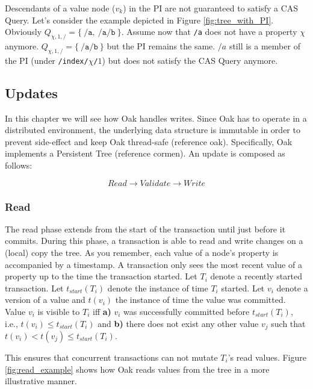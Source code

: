 \documentclass[abstracton,12pt]{scrreprt}
\begin{document}
Descendants of a value node ($v_k$) in the PI are not guaranteed to satisfy a CAS Query. 
Let's consider the example depicted in Figure \ref{fig:tree_with_PI}.
Obviously $Q_{\chi, 1, \texttt{/}} = \{\ \texttt{/a},\ \texttt{/a/b}\ \}$.
Assume now that \texttt{/a} does not have a property $\chi$ anymore.
$Q_{\chi, 1, \texttt{/}} = \{\ \texttt{/a/b}\ \}$ but the PI remains the same.
$/a$ still is a member of the PI (under \texttt{/index/$\chi$/$1$}) but does not satisfy the CAS Query anymore.

\subsection{Updates}

In this chapter we will see how Oak handles writes.
Since Oak has to operate in a distributed environment, the underlying data structure is immutable in order to prevent side-effect and keep Oak thread-safe (reference oak).
Specifically, Oak implements a Persistent Tree (reference cormen).
An update is composed as follows:

$$
Read \longrightarrow Validate \longrightarrow Write
$$

\subsubsection{Read}

The read phase extends from the start of the transaction until just before it commits.
During this phase, a transaction is able to read and write changes on a (local) copy the tree.
As you remember, each value of a node's property is accompanied by a timestamp.
A transaction only sees the most recent value of a property up to the time the transaction started.
Let $T_i$ denote a recently started transaction.
Let $t_{start}(T_i)$ denote the instance of time $T_i$ started.
Let $v_i$ denote a version of a value and $t(v_i)$ the instance of time the value was committed.
Value $v_i$ is visible to $T_i$ iff
\textbf{a)} $v_i$ was successfully committed before $t_{start}(T_i)$, i.e., $t(v_i) \leq t_{start}(T_i)$ and
\textbf{b)} there does not exist any other value $v_j$ such that $t(v_i) < t(v_j) \leq t_{start}(T_i)$.

This ensures that concurrent transactions can not mutate $T_i$'s read values.
Figure \ref{fig:read_example} shows how Oak reads values from the tree in a more illustrative manner.
\end{document}
